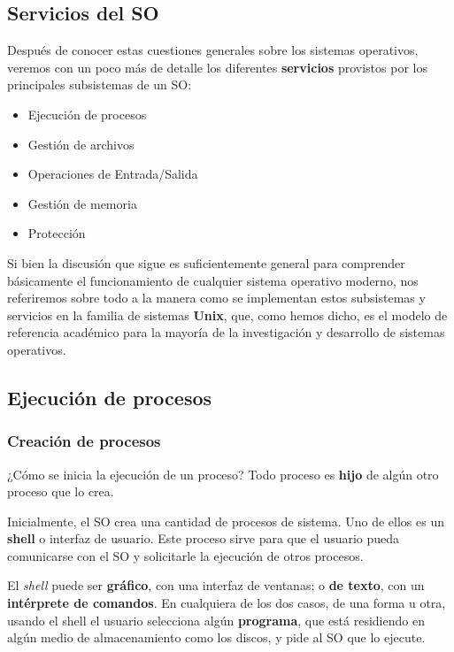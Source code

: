 \documentclass[spanish,A4,]{article}
\begin{document}
\subsection{Servicios del SO}\label{servicios-del-so}

Después de conocer estas cuestiones generales sobre los sistemas
operativos, veremos con un poco más de detalle los diferentes
\textbf{servicios} provistos por los principales subsistemas de un SO:

\begin{itemize}
\itemsep1pt\parskip0pt
\item
  Ejecución de procesos
\item
  Gestión de archivos
\item
  Operaciones de Entrada/Salida
\item
  Gestión de memoria
\item
  Protección
\end{itemize}

Si bien la discusión que sigue es suficientemente general para
comprender básicamente el funcionamiento de cualquier sistema operativo
moderno, nos referiremos sobre todo a la manera como se implementan
estos subsistemas y servicios en la familia de sistemas \textbf{Unix},
que, como hemos dicho, es el modelo de referencia académico para la
mayoría de la investigación y desarrollo de sistemas operativos.

\subsection{Ejecución de procesos}\label{ejecuciuxf3n-de-procesos}

\subsubsection{Creación de procesos}\label{creaciuxf3n-de-procesos}

¿Cómo se inicia la ejecución de un proceso? Todo proceso es
\textbf{hijo} de algún otro proceso que lo crea.

Inicialmente, el SO crea una cantidad de procesos de sistema. Uno de
ellos es un \textbf{shell} o interfaz de usuario. Este proceso sirve
para que el usuario pueda comunicarse con el SO y solicitarle la
ejecución de otros procesos.

El \emph{shell} puede ser \textbf{gráfico}, con una interfaz de
ventanas; o \textbf{de texto}, con un \textbf{intérprete de comandos}.
En cualquiera de los dos casos, de una forma u otra, usando el shell el
usuario selecciona algún \textbf{programa}, que está residiendo en algún
medio de almacenamiento como los discos, y pide al SO que lo ejecute.
\end{document}
